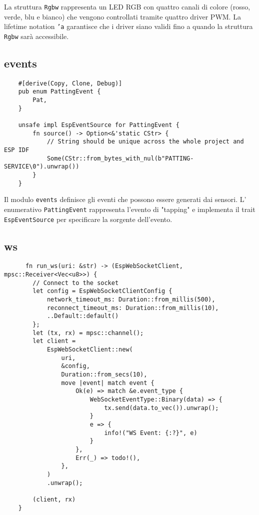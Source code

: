 La struttura \texttt{Rgbw} rappresenta un LED RGB con quattro canali di colore (rosso, verde, blu e bianco)
che vengono controllati tramite quattro driver PWM. La lifetime notation \texttt{'a} garantisce che
i driver siano validi fino a quando la struttura \texttt{Rgbw} sarà accessibile.

\subsection{events}

\begin{listing}[H]
    \begin{verbatim}
    #[derive(Copy, Clone, Debug)]
    pub enum PattingEvent {
        Pat,
    }

    unsafe impl EspEventSource for PattingEvent {
        fn source() -> Option<&'static CStr> {
            // String should be unique across the whole project and ESP IDF
            Some(CStr::from_bytes_with_nul(b"PATTING-SERVICE\0").unwrap())
        }
    }
    \end{verbatim}
\end{listing}

Il modulo \texttt{events} definisce gli eventi che possono essere generati dai sensori.
L' enumerativo \texttt{PattingEvent} rappresenta l'evento di "tapping" e implementa il trait \texttt{EspEventSource}
per specificare la sorgente dell'evento.

\subsection{ws}

\begin{listing}[H]
    \begin{verbatim}
      fn run_ws(uri: &str) -> (EspWebSocketClient, mpsc::Receiver<Vec<u8>>) {
        // Connect to the socket
        let config = EspWebSocketClientConfig {
            network_timeout_ms: Duration::from_millis(500),
            reconnect_timeout_ms: Duration::from_millis(10),
            ..Default::default()
        };
        let (tx, rx) = mpsc::channel();
        let client =
            EspWebSocketClient::new(
                uri,
                &config,
                Duration::from_secs(10),
                move |event| match event {
                    Ok(e) => match &e.event_type {
                        WebSocketEventType::Binary(data) => {
                            tx.send(data.to_vec()).unwrap();
                        }
                        e => {
                            info!("WS Event: {:?}", e)
                        }
                    },
                    Err(_) => todo!(),
                },
            )
            .unwrap();
    
        (client, rx)
    }
    \end{verbatim}
\end{listing}

